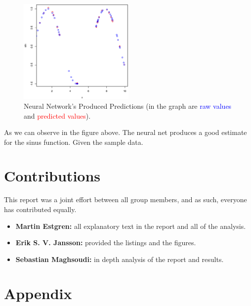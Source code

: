 \documentclass[a4paper, twocolumn]{article}
\begin{document}
    \begin{figure}[h!]
        \centering
        \caption{Neural Network's Produced Predictions (in the graph are \textcolor{blue}{raw values} and \textcolor{red}{predicted values}).}
        \label{fig:predictions}
        \includegraphics[width=0.5\textwidth]{share/predictions.eps}
    \end{figure}
    As we can observe in the figure above. The neural net produces a good estimate for the sinus function. Given the sample data.

    \section*{Contributions}

    This report was a joint effort between all group members, and as such, everyone has contributed equally.
    \begin{itemize}
        \item{\textbf{Martin Estgren:} all explanatory text in the report and all of the analysis.}
        \item{\textbf{Erik S. V. Jansson:} provided the listings and the figures.}
        \item{\textbf{Sebastian Maghsoudi:} in depth analysis of the report and results.}
    \end{itemize}

    \nocite{*} %
    
    
    \onecolumn \appendix
    \section*{Appendix}

    
    
\end{document}
